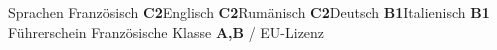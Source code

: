 
\begin{cvskills}[0.85]
	\cvskill
	{Sprachen}
	{Französisch \textbf{C2}\allowbreak\hspace{0.6em}Englisch \textbf{C2}\allowbreak\hspace{0.6em}Rumänisch \textbf{C2}\allowbreak\hspace{0.6em}Deutsch \textbf{B1}\allowbreak\hspace{0.6em}Italienisch \textbf{B1}}
	\cvskill
	{Führerschein}
	{Französische Klasse \textbf{A,B} / EU-Lizenz}
\end{cvskills}
